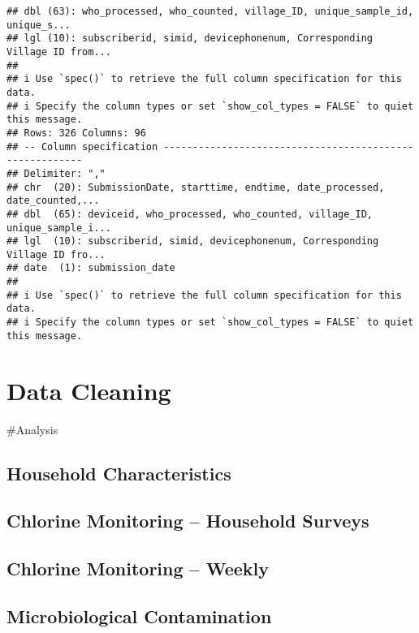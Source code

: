\documentclass[
]{article}
\begin{document}
\begin{verbatim}
## dbl (63): who_processed, who_counted, village_ID, unique_sample_id, unique_s...
## lgl (10): subscriberid, simid, devicephonenum, Corresponding Village ID from...
## 
## i Use `spec()` to retrieve the full column specification for this data.
## i Specify the column types or set `show_col_types = FALSE` to quiet this message.
## Rows: 326 Columns: 96
## -- Column specification --------------------------------------------------------
## Delimiter: ","
## chr  (20): SubmissionDate, starttime, endtime, date_processed, date_counted,...
## dbl  (65): deviceid, who_processed, who_counted, village_ID, unique_sample_i...
## lgl  (10): subscriberid, simid, devicephonenum, Corresponding Village ID fro...
## date  (1): submission_date
## 
## i Use `spec()` to retrieve the full column specification for this data.
## i Specify the column types or set `show_col_types = FALSE` to quiet this message.
\end{verbatim}

\newpage

\hypertarget{data-cleaning}{%
\section{Data Cleaning}\label{data-cleaning}}

\newpage

\#Analysis

\hypertarget{household-characteristics}{%
\subsection{Household Characteristics}\label{household-characteristics}}

\hypertarget{chlorine-monitoring-household-surveys}{%
\subsection{Chlorine Monitoring -- Household
Surveys}\label{chlorine-monitoring-household-surveys}}

\hypertarget{chlorine-monitoring-weekly}{%
\subsection{Chlorine Monitoring --
Weekly}\label{chlorine-monitoring-weekly}}

\hypertarget{microbiological-contamination}{%
\subsection{Microbiological
Contamination}\label{microbiological-contamination}}
\end{document}
